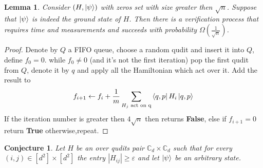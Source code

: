 \documentclass{article}
\newtheorem{lemma}[theorem]{Lemma}
\newtheorem{conjecture}[theorem]{Conjecture}
\begin{document}
\begin{lemma} Consider \( \left( H, \ket{\psi} \right) \) with zeros set with size greater then \(\sqrt{n}\). Suppose that \(\ket{\psi} \) is indeed the ground state of \(H\). Then there is a verification process that requires  time and measurements and succeeds with probability \( \Omega\left(\frac{1}{\sqrt{n}}\right)\).
\end{lemma}

\begin{proof}
Denote by \(Q\) a FIFO queue, choose a random qudit and insert it into \(Q\), define \(f_0 = 0 \). while \(f_0 \neq 0\) (and it's not the first iteration) pop the first qudit from \(Q\), denote it by \(q\) and apply all the Hamiltonian which act over it. Add the result to 
\begin{equation*}
     f_{i+1} \leftarrow f_{i} + \frac{1}{m}\sum_{H_{j} \text{ act on q} }{ \bra{q,p} H_i \ket{q,p} } 
\end{equation*} If the iteration number is greater then \(4\sqrt{n}\) then returns \textbf{False}, else if \(f_{i+1} =0 \) return \textbf{True} otherwise,repeat.       
\end{proof}


\begin{conjecture}
Let \(H\) be an \Ham over qudits pair \( \mathbb{C}_d \times \mathbb{C}_d \) such that for every \((i,j) \in [d^{2}]\times[d^{2}]\) the entry \( |H_{ij}| \ge \varepsilon \) and let \( \ket{\psi} \) be an arbitrary state.


\end{conjecture}

\printbibliography 
\end{document}
